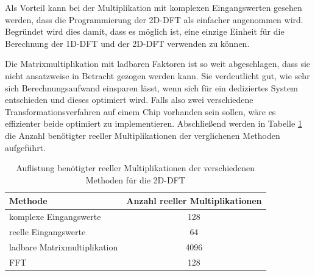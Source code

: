 Als Vorteil kann bei der Multiplikation mit komplexen Eingangswerten gesehen werden, dass die Programmierung der 2D-DFT als einfacher angenommen wird.
Begründet wird dies damit, dass es möglich ist, eine einzige Einheit für die Berechnung der 1D-DFT und der 2D-DFT verwenden zu können.

Die Matrixmultiplikation mit ladbaren Faktoren ist so weit abgeschlagen, dass sie nicht ansatzweise in Betracht gezogen werden kann. Sie verdeutlicht gut, wie sehr sich Berechnungsaufwand einsparen lässt, wenn sich für ein dediziertes System entschieden und dieses optimiert wird.
Falls also zwei verschiedene Transformationsverfahren auf einem Chip vorhanden sein sollen, wäre es effizienter beide optimiert zu implementieren.
Abschließend werden in Tabelle \ref{tab:AuflistungMultiplikationen} die Anzahl benötigter reeller Multiplikationen der verglichenen Methoden aufgeführt.


\begin{table}[ht!]
\centering
\caption{Auflistung benötigter reeller Multiplikationen der verschiedenen Methoden für die 2D-DFT}
 \begin{tabular}{lc}
  \hline
  Methode  & Anzahl reeller Multiplikationen\\
  \hline
  komplexe Eingangswerte & 128\\
  reelle Eingangswerte   & 64\\
  ladbare Matrixmultiplikation & 4096\\
  FFT   & 128\\
  \hline
 \end{tabular}
 \label{tab:AuflistungMultiplikationen}
\end{table}
